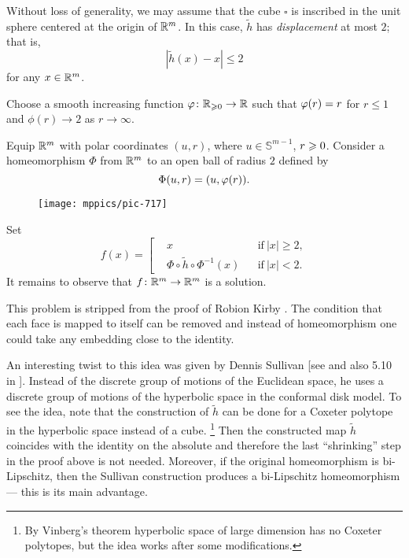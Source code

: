 Without loss of generality, we may assume that the cube $\square$ is inscribed in the unit sphere centered at the origin of $\mathbb{R}^m$.
In this case, $\tilde h$ has \emph{displacement} at most $2$;
that is, 
\[|\tilde h(x)-x|\le 2\]
for any $x\in\mathbb{R}^m$.

Choose a smooth increasing function $\varphi\colon\mathbb{R}_{\geqslant 0} \to\mathbb{R}$ such that
$\phi(r)\z=r$
for $r\le 1$ and $\phi(r)\to 2$ as $r\to\infty$.

Equip $\mathbb{R}^m$ with polar coordinates $(u,r)$, 
where $u\in\mathbb{S}^{m-1}$, $r\z\ge 0$.
Consider a homeomorphism $\Phi$ from $\mathbb{R}^m$ to an open ball of radius $2$
defined by 
\[\Phi(u,r)\z=(u,\phi(r)).\]



\begin{wrapfigure}{o}{41 mm}
\vskip-0mm
\centering
\texttt{[image: mppics/pic-717]}
\vskip0mm
\end{wrapfigure}

Set 
\[
f(x)=\left[
\begin{aligned}
&x&&\text{if}\ |x|\ge 2,
\\
&\Phi\circ \tilde h \circ \Phi^{-1}(x)&&\text{if}\ |x|< 2.
\end{aligned}
\right.
\]
It remains to observe that $f\colon\mathbb{R}^m\to\mathbb{R}^m$ is a solution.
\qeds

This problem is stripped from the proof of Robion Kirby \cite{kirby}.
The condition that each face is mapped to itself can be removed and 
instead of homeomorphism one could take any embedding close to the identity.

An interesting twist to this idea was given by Dennis Sullivan [see  and also 5.10 in ].
Instead of the discrete group of motions of the Euclidean space,
he uses a discrete group of motions of the hyperbolic space in the conformal disk model.
To see the idea, note that the construction of $\tilde h$ can be done for a Coxeter polytope in the hyperbolic space instead of a cube.%
\footnote{By Vinberg's theorem \cite{vinberg, vinberg-strong} hyperbolic space of large dimension has no Coxeter polytopes, but the idea works after some modifications.}
Then the constructed map $\tilde h$
coincides with the identity on the absolute and therefore the last ``shrinking'' step in the proof above is not needed.
Moreover, 
if the original homeomorphism is bi-Lipschitz,
then the Sullivan construction produces a bi-Lipschitz homeomorphism ---
this is its main advantage.

  


